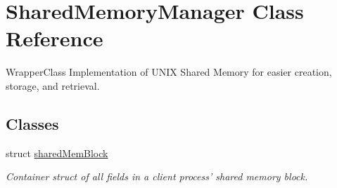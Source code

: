 \hypertarget{classSharedMemoryManager}{\section{Shared\-Memory\-Manager Class Reference}
\label{classSharedMemoryManager}
}


Wrapper\-Class Implementation of U\-N\-I\-X Shared Memory for easier creation, storage, and retrieval.  


\subsection*{Classes}
\begin{DoxyCompactItemize}
\item 
struct \hyperlink{structSharedMemoryManager_1_1sharedMemBlock}{shared\-Mem\-Block}
\begin{DoxyCompactList}\small\item\em Container struct of all fields in a client process' shared memory block. \end{DoxyCompactList}\end{DoxyCompactItemize}

